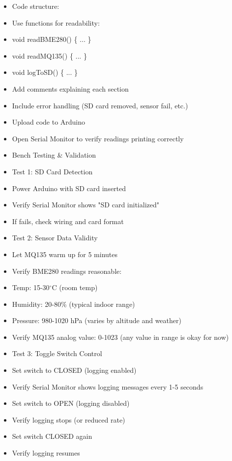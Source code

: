 \documentclass[11pt,letterpaper]{article}
\begin{document}
\begin{itemize}
  \item Code structure:
  \item Use functions for readability:
  \item void readBME280() \{ ... \}
  \item void readMQ135() \{ ... \}
  \item void logToSD() \{ ... \}
  \item Add comments explaining each section
  \item Include error handling (SD card removed, sensor fail, etc.)
\end{itemize}

\begin{itemize}
  \item Upload code to Arduino
  \item Open Serial Monitor to verify readings printing correctly
\end{itemize}

\begin{itemize}
  \item Bench Testing \& Validation
  \item Test 1: SD Card Detection
  \item Power Arduino with SD card inserted
  \item Verify Serial Monitor shows "SD card initialized"
  \item If fails, check wiring and card format
\end{itemize}

\begin{itemize}
  \item Test 2: Sensor Data Validity
  \item Let MQ135 warm up for 5 minutes
  \item Verify BME280 readings reasonable:
  \item Temp: 15-30$^\circ$C (room temp)
  \item Humidity: 20-80\% (typical indoor range)
  \item Pressure: 980-1020 hPa (varies by altitude and weather)
  \item Verify MQ135 analog value: 0-1023 (any value in range is okay for now)
\end{itemize}

\begin{itemize}
  \item Test 3: Toggle Switch Control
  \item Set switch to CLOSED (logging enabled)
  \item Verify Serial Monitor shows logging messages every 1-5 seconds
  \item Set switch to OPEN (logging disabled)
  \item Verify logging stops (or reduced rate)
  \item Set switch CLOSED again
  \item Verify logging resumes
\end{itemize}
\end{document}
